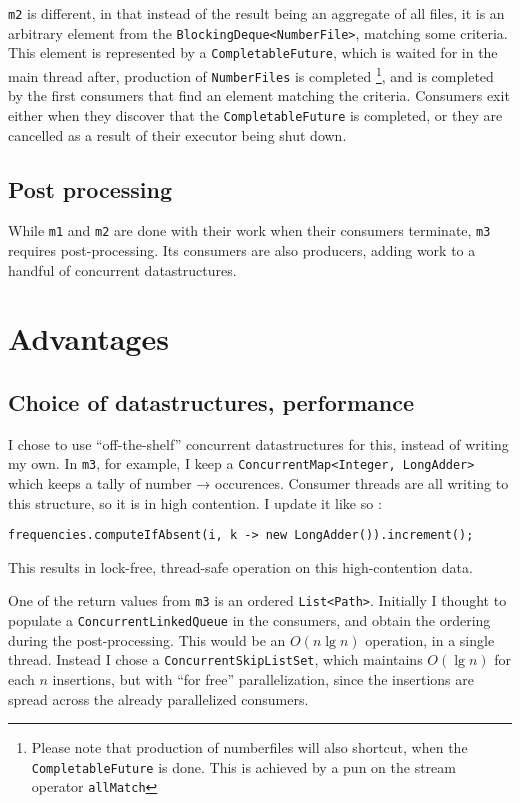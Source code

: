 \documentclass[a4paper,11pt]{article}
\begin{document}
\texttt{m2} is different, in that instead of the result being an
aggregate of all files, it is an arbitrary element from the
\texttt{BlockingDeque<NumberFile>}, matching some criteria.  This
element is represented by a \texttt{CompletableFuture}, which is
waited for in the main thread after, production of
\texttt{NumberFiles} is completed
\footnote{Please note that
  production of numberfiles will also shortcut, when the
  \texttt{CompletableFuture} is done.  This is achieved by a pun on
  the stream operator \texttt{allMatch}
}, and is completed by
the first consumers that find an element matching the criteria.
Consumers exit either when they discover that the
\texttt{CompletableFuture} is completed, or they are cancelled as a
result of their executor being shut down.

\subsection{Post processing}

While \texttt{m1} and \texttt{m2} are done with their work when their
consumers terminate, \texttt{m3} requires post-processing.  Its
consumers are also producers, adding work to a handful of concurrent
datastructures.   

\section{Advantages}

\subsection{Choice of datastructures, performance}

I chose to use ``off-the-shelf'' concurrent datastructures for this,
instead of writing my own.  In \texttt{m3}, for example, I keep a
\texttt{ConcurrentMap<Integer, LongAdder>} which keeps a tally of
number → occurences.  Consumer threads are all writing to this
structure, so it is in high contention.  I update it like so
:

\begin{verbatim}
frequencies.computeIfAbsent(i, k -> new LongAdder()).increment();
\end{verbatim}

This results in lock-free, thread-safe operation on this
high-contention data.

One of the return values from \texttt{m3} is an ordered
\texttt{List<Path>}.  Initially I thought to populate a
\texttt{ConcurrentLinkedQueue} in the consumers, and obtain the
ordering during the post-processing.  This would be an \(O(n \lg n) \)
operation, in a single thread.  Instead I chose a
\texttt{ConcurrentSkipListSet}, which maintains $O(\lg n)$ for each
$n$ insertions, but with ``for free'' parallelization, since the
insertions are spread across the already parallelized consumers.
\end{document}
